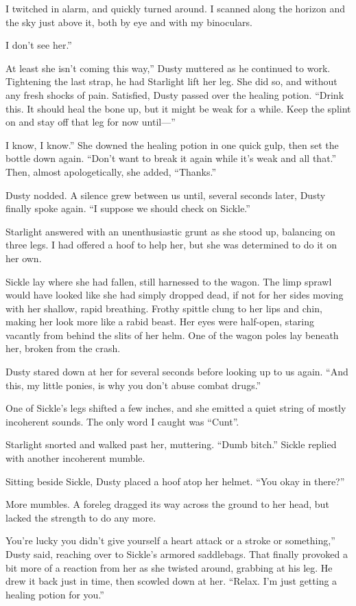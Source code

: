 I twitched in alarm, and quickly turned around. I scanned along the horizon and the sky just above it, both by eye and with my binoculars.

\leavevmode{}I don’t see her.”

\leavevmode{}At least she isn’t coming this way,” Dusty muttered as he continued to work. Tightening the last strap, he had Starlight lift her leg. She did so, and without any fresh shocks of pain. Satisfied, Dusty passed over the healing potion. “Drink this. It should heal the bone up, but it might be weak for a while. Keep the splint on and stay off that leg for now until—”

\leavevmode{}I know, I know.” She downed the healing potion in one quick gulp, then set the bottle down again. “Don’t want to break it again while it’s weak and all that.” Then, almost apologetically, she added, “Thanks.”

Dusty nodded. A silence grew between us until, several seconds later, Dusty finally spoke again. “I suppose we should check on Sickle.”

Starlight answered with an unenthusiastic grunt as she stood up, balancing on three legs. I had offered a hoof to help her, but she was determined to do it on her own.

Sickle lay where she had fallen, still harnessed to the wagon. The limp sprawl would have looked like she had simply dropped dead, if not for her sides moving with her shallow, rapid breathing. Frothy spittle clung to her lips and chin, making her look more like a rabid beast. Her eyes were half-open, staring vacantly from behind the slits of her helm. One of the wagon poles lay beneath her, broken from the crash.

Dusty stared down at her for several seconds before looking up to us again. “And this, my little ponies, is why you don’t abuse combat drugs.”

One of Sickle’s legs shifted a few inches, and she emitted a quiet string of mostly incoherent sounds. The only word I caught was “Cunt”.

Starlight snorted and walked past her, muttering. “Dumb bitch.” Sickle replied with another incoherent mumble.

Sitting beside Sickle, Dusty placed a hoof atop her helmet. “You okay in there?”

More mumbles. A foreleg dragged its way across the ground to her head, but lacked the strength to do any more.

\leavevmode{}You’re lucky you didn’t give yourself a heart attack or a stroke or something,” Dusty said, reaching over to Sickle’s armored saddlebags. That finally provoked a bit more of a reaction from her as she twisted around, grabbing at his leg. He drew it back just in time, then scowled down at her. “Relax. I’m just getting a healing potion for you.”

